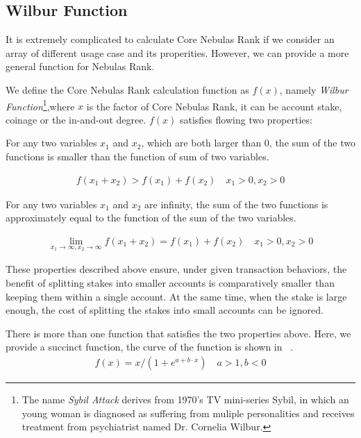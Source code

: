 \subsection{Wilbur Function \label{sec:function}}
It is extremely complicated to calculate Core Nebulas Rank if we consider an array of different usage case and its properities. However, we can provide a more general function for Nebulas Rank.

We define the Core Nebulas Rank calculation function as \(f(x)\), namely \emph{Wilbur Function}\footnote{The name \emph{Sybil Attack} derives from 1970's TV mini-series Sybil, in which an young woman is diagnosed as suffering from muliple personalities and receives treatment from psychiatrist named Dr. Cornelia Wilbur.},where \(x\) is the factor of Core Nebulas Rank, it can be account stake, coinage or the in-and-out degree. $f(x)$ satisfies flowing two properties:

\begin{property}
\label{prop:one}
For any two variables $x_1$ and $x_2$, which are both larger than $0$, the sum of the two functions is smaller than the function of sum of two variables.
\end{property}

\begin{align}
f(x_1+x_2)>f(x_1)+f(x_2) \quad x_1>0,x_2>0
\end{align}

\begin{property}
\label{prop:two}
For any two variables $x_1$ and $x_2$ are infinity, the sum of the two functions is approximately equal to the function of the sum of the two variables.
\end{property}

\begin{align}
\lim\limits_{x_1 \to \infty, x_2\to \infty} f(x_1+x_2) = f(x_1) + f(x_2)\quad x_1>0, x_2>0
\end{align}

These properties described above ensure, under given transaction behaviors, the benefit of splitting stakes into smaller accounts is comparatively smaller than keeping them within a single account. At the same time, when the stake is large enough, the cost of splitting the stakes into small accounts can be ignored. 

There is more than one function that satisfies the two properties above. Here, we provide a succinct function, the curve of the function is shown in ~.
\begin{align}
f(x) = x/(1 + e^{a + b\cdot x}) \quad a>1,b<0
\end{align}

